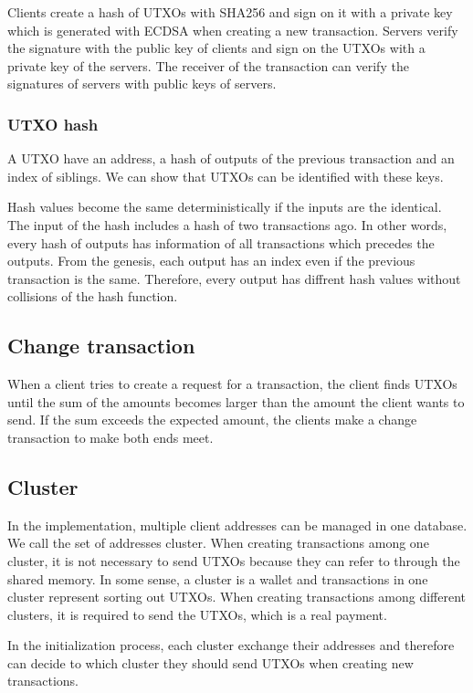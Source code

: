 \documentclass[a4paper, oneside]{discothesis}
\begin{document}
Clients create a hash of UTXOs with SHA256 and sign on it with a private key
which is generated with ECDSA when creating a new transaction.
Servers verify the signature with the public key of clients and sign on the UTXOs
with a private key of the servers.
The receiver of the transaction can verify the signatures of servers with public keys
of servers.

\subsubsection{UTXO hash}
A UTXO have an address, a hash of outputs of the previous transaction and an index of siblings.
We can show that UTXOs can be identified with these keys.

Hash values become the same deterministically if the inputs are the identical.
The input of the hash includes a hash of two transactions ago.
In other words, every hash of outputs has information of all transactions
which precedes the outputs.
From the genesis, each output has an index even if the previous transaction is the same.
Therefore, every output has diffrent hash values without collisions of the hash function.


\subsection{Change transaction}
When a client tries to create a request for a transaction,
the client finds UTXOs until the sum of the amounts
becomes larger than the amount the client wants to send.
If the sum exceeds the expected amount, the clients make a change transaction
to make both ends meet.

\subsection{Cluster}
In the implementation, multiple client addresses can be managed in one database.
We call the set of addresses cluster.
When creating transactions among one cluster, it is not necessary to send UTXOs
because they can refer to through the shared memory.
In some sense, a cluster is a wallet and transactions in one cluster represent sorting out UTXOs.
When creating transactions among different clusters, it is required to send the UTXOs,
which is a real payment.

In the initialization process, each cluster exchange their addresses
and therefore can decide to which cluster they should send UTXOs when creating new transactions.
\end{document}
